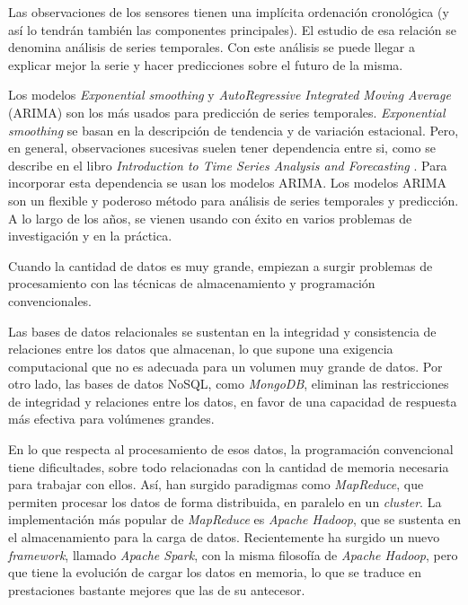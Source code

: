 \documentclass[11pt,spanish,listoffigures,listoftables]{tfgetsinf}
\begin{document}
Las observaciones de los sensores tienen una implícita ordenación cronológica (y así lo tendrán también las componentes principales). El estudio de esa relación se denomina análisis de series temporales. Con este análisis se puede llegar a explicar mejor la serie y hacer predicciones sobre el futuro de la misma. 

Los modelos {\em Exponential smoothing} y {\em AutoRegressive Integrated Moving Average} (ARIMA) son los más usados para predicción de series temporales. {\em Exponential smoothing} se basan en la descripción de tendencia y de variación estacional. Pero, en general, observaciones sucesivas suelen tener dependencia entre si, como se describe en el libro \textit{Introduction to Time Series Analysis and Forecasting} \cite{montgomery}. Para incorporar esta dependencia se usan los modelos ARIMA. Los modelos ARIMA son un flexible y poderoso método para análisis de series temporales y predicción. A lo largo de los años, se vienen usando con éxito en varios problemas de investigación y en la práctica.

Cuando la cantidad de datos es muy grande, empiezan a surgir problemas de procesamiento con las técnicas de almacenamiento y programación convencionales. 

Las bases de datos relacionales se sustentan en la integridad y consistencia de relaciones entre los datos que almacenan, lo que supone una exigencia computacional que no es adecuada para un volumen muy grande de datos. Por otro lado, las bases de datos NoSQL, como {\em MongoDB}, eliminan las restricciones de integridad y relaciones entre los datos, en favor de una capacidad de respuesta más efectiva para volúmenes grandes. 

En lo que respecta al procesamiento de esos datos, la programación convencional tiene dificultades, sobre todo relacionadas con la cantidad de memoria necesaria para trabajar con ellos. Así, han surgido paradigmas como {\em MapReduce}, que permiten procesar los datos de forma distribuida, en paralelo en un {\em cluster}. La implementación más popular de {\em MapReduce} es {\em Apache Hadoop}, que se sustenta en el almacenamiento para la carga de datos. Recientemente ha surgido un nuevo {\em framework}, llamado {\em Apache Spark}, con la misma filosofía de {\em Apache Hadoop}, pero que tiene la evolución de cargar los datos en memoria, lo que se traduce en prestaciones bastante mejores que las de su antecesor.


\end{document}
